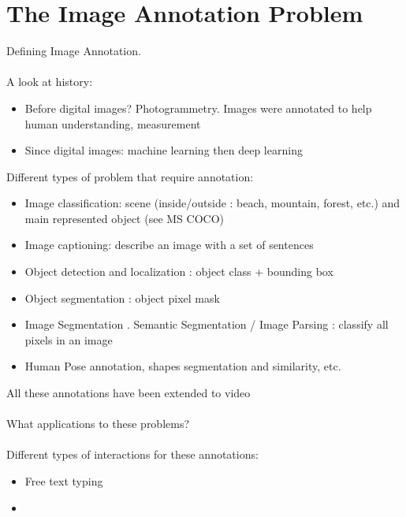 \chapter{The Image Annotation Problem}%
\label{cha:the_image_annotation_problem}

Defining Image Annotation. \\ \\ 

A look at history:
\begin{itemize}
	\item Before digital images? Photogrammetry. Images were annotated to help human understanding, measurement
	\item Since digital images: machine learning then deep learning
\end{itemize}


Different types of problem that require annotation:
\begin{itemize}
	\item Image classification: scene (inside/outside : beach, mountain, forest, etc.) and main represented object (see MS COCO)
	\item Image captioning: describe an image with a set of sentences
	\item Object detection and localization : object class + bounding box
	\item Object segmentation : object pixel mask
	\item Image Segmentation . Semantic Segmentation / Image Parsing : classify all pixels in an image
	\item Human Pose annotation, shapes segmentation and similarity, etc.
\end{itemize}
All these annotations have been extended to video \\ \\

What applications to these problems? \\ \\

Different types of interactions for these annotations:

\begin{itemize}
	\item Free text typing
	\item  
\end{itemize}


